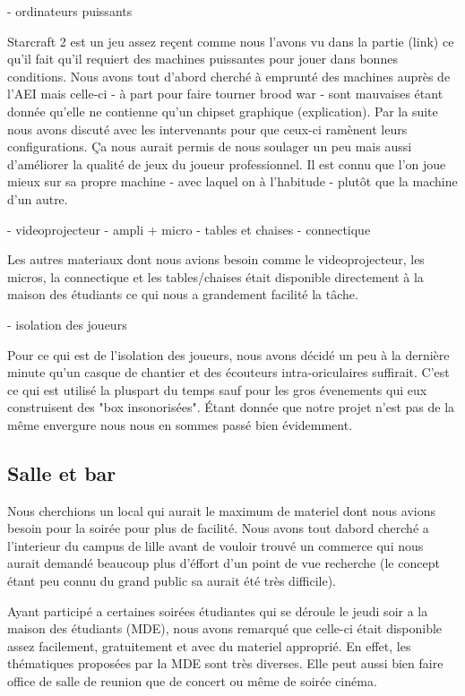 - ordinateurs puissants

  Starcraft 2 est un jeu assez reçent comme nous l'avons vu dans la
partie (link) ce qu'il fait qu'il requiert des machines puissantes pour jouer
dans bonnes conditions. Nous avons tout d'abord cherché à emprunté des
machines auprès de l'AEI mais celle-ci - à part pour faire tourner brood
war - sont mauvaises étant donnée qu'elle ne contienne qu'un chipset
graphique (explication). Par la suite nous avons discuté avec les
intervenants pour que ceux-ci ramènent leurs configurations. Ça nous
aurait permis de nous soulager un peu mais aussi d'améliorer la qualité
de jeux du joueur professionnel. Il est connu que l'on joue mieux sur sa
propre machine - avec laquel on à l'habitude - plutôt que la machine d'un
autre.

- videoprojecteur
- ampli + micro
- tables et chaises
- connectique

Les autres materiaux dont nous avions besoin comme le videoprojecteur,
les micros, la connectique et les tables/chaises était disponible directement à
la maison des étudiants ce qui nous a grandement facilité la tâche.

- isolation des joueurs

Pour ce qui est de l'isolation des joueurs, nous avons décidé un peu à
la dernière minute qu'un casque de chantier et des écouteurs
intra-oriculaires suffirait. C'est ce qui est utilisé la pluspart du
temps sauf pour les gros évenements qui eux construisent des "box
insonorisées". Étant donnée que notre projet n'est pas de la même
envergure nous nous en sommes passé bien évidemment.

\subsection{Salle et bar} %
\label{sub:salle_et_bar}

Nous cherchions un local qui aurait le maximum de materiel dont nous
avions besoin pour la soirée pour plus de facilité. Nous avons tout
dabord cherché a l'interieur du campus de lille avant de vouloir trouvé
un commerce qui nous aurait demandé beaucoup plus d'éffort d'un point de
vue recherche (le concept étant peu connu du grand public sa aurait été
très difficile).

Ayant participé a certaines soirées étudiantes qui se déroule le jeudi
soir a la maison des étudiants (MDE), nous avons remarqué que celle-ci
était disponible assez facilement, gratuitement et avec du materiel
approprié. En effet, les thématiques proposées par la MDE sont très
diverses. Elle peut aussi bien faire office de salle de reunion que de
concert ou même de soirée cinéma.

